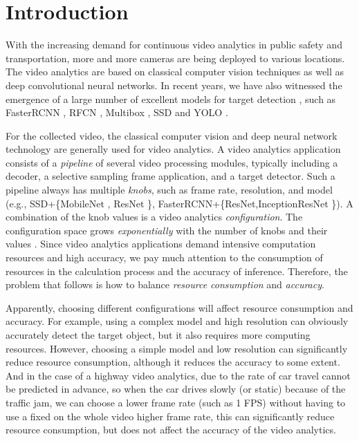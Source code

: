 \section{Introduction}
\label{Section: introduction}
With the increasing demand for continuous video analytics in public safety and transportation, more and more cameras are being deployed to various locations. The video analytics are based on classical computer vision techniques as well as deep convolutional neural networks. In recent years, we have also witnessed the emergence of a large number of excellent models for target detection \cite{huang2017speed_accuracy}, such as FasterRCNN \cite{ren2015faster_rcnn}, RFCN \cite{dai2016r_fcn}, Multibox \cite{szegedy2014multibox}, SSD \cite{liu2016ssd} and YOLO \cite{redmon2016yolo}.

For the collected video, the classical computer vision and deep neural network technology are generally used for video analytics. A video analytics application consists of a \emph{pipeline} of several video processing modules, typically including a decoder, a selective sampling frame application, and a target detector. Such a pipeline always has multiple \emph{knobs}, such as frame rate, resolution, and model (e.g., SSD+\{MobileNet \cite{howard2017mobilenets}, ResNet \cite{he2016resnet}\}, FasterRCNN+\{ResNet,InceptionResNet \cite{szegedy2016inception}\}). A combination of the knob values is a video analytics \emph{configuration}. The configuration space grows \emph{exponentially} with the number of knobs and their values \cite{jiang2018chameleon}. Since video analytics applications demand intensive computation resources and high accuracy, we pay much attention to the consumption of resources in the calculation process and the accuracy of inference. Therefore, the problem that follows is how to balance \emph{resource consumption} and \emph{accuracy}. 

Apparently, choosing different configurations will affect resource consumption and accuracy. For example, using a complex model and high resolution can obviously accurately detect the target object, but it also requires more computing resources. However, choosing a simple model and low resolution can significantly reduce resource consumption, although it reduces the accuracy to some extent. And in the case of a highway video analytics, due to the rate of car travel cannot be predicted in advance, so when the car drives slowly (or static) because of the traffic jam, we can choose a lower frame rate (such as 1 FPS) without having to use a fixed on the whole video higher frame rate, this can significantly reduce resource consumption, but does not affect the accuracy of the video analytics. 

